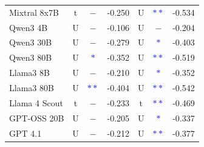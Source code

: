\begin{table}[h]
{\begin{tabular}{@{}l|ccc|ccc@{}}
        \cellcolor{blue!50!black!10}Mixtral 8x7B & \cellcolor{blue!50!black!10}t & \cellcolor{blue!50!black!10}$-$ & \cellcolor{blue!50!black!10}-0.250 & \cellcolor{blue!50!black!10}U & \cellcolor{blue!50!black!10}\textcolor{blue}{$\ast\ast$} & \cellcolor{blue!50!black!10}-0.534 \\
        \cellcolor{brown!10}Qwen3 4B & \cellcolor{brown!10}U & \cellcolor{brown!10}$-$ & \cellcolor{brown!10}-0.106 & \cellcolor{brown!10}U & \cellcolor{brown!10}$-$ & \cellcolor{brown!10}-0.204 \\
        \cellcolor{brown!50!black!10}Qwen3 30B & \cellcolor{brown!50!black!10}U & \cellcolor{brown!50!black!10}$-$ & \cellcolor{brown!50!black!10}-0.279 & \cellcolor{brown!50!black!10}U & \cellcolor{brown!50!black!10}\textcolor{blue}{$\ast$} & \cellcolor{brown!50!black!10}-0.403 \\
        \cellcolor{brown!70!black!10}Qwen3 80B & \cellcolor{brown!70!black!10}U & \cellcolor{brown!70!black!10}\textcolor{blue}{$\ast$} & \cellcolor{brown!70!black!10}-0.352 & \cellcolor{brown!70!black!10}U & \cellcolor{brown!70!black!10}\textcolor{blue}{$\ast\ast$} & \cellcolor{brown!70!black!10}-0.519 \\
        \cellcolor{green!10}Llama3 8B & \cellcolor{green!10}U & \cellcolor{green!10}$-$ & \cellcolor{green!10}-0.210 & \cellcolor{green!10}U & \cellcolor{green!10}\textcolor{blue}{$\ast$} & \cellcolor{green!10}-0.352 \\
        \cellcolor{green!50!black!10}Llama3 80B & \cellcolor{green!50!black!10}U & \cellcolor{green!50!black!10}\textcolor{blue}{$\ast\ast$} & \cellcolor{green!50!black!10}-0.404 & \cellcolor{green!50!black!10}U & \cellcolor{green!50!black!10}\textcolor{blue}{$\ast\ast$} & \cellcolor{green!50!black!10}-0.542 \\
        \cellcolor{green!70!black!10}Llama 4 Scout & \cellcolor{green!70!black!10}t & \cellcolor{green!70!black!10}$-$ & \cellcolor{green!70!black!10}-0.233 & \cellcolor{green!70!black!10}t & \cellcolor{green!70!black!10}\textcolor{blue}{$\ast\ast$} & \cellcolor{green!70!black!10}-0.469 \\
        \cellcolor{cyan!10}GPT-OSS 20B & \cellcolor{cyan!10}U & \cellcolor{cyan!10}$-$ & \cellcolor{cyan!10}-0.205 & \cellcolor{cyan!10}U & \cellcolor{cyan!10}\textcolor{blue}{$\ast$} & \cellcolor{cyan!10}-0.337 \\
        \cellcolor{teal!10}GPT 4.1 & \cellcolor{teal!10}U & \cellcolor{teal!10}$-$ & \cellcolor{teal!10}-0.212 & \cellcolor{teal!10}U & \cellcolor{teal!10}\textcolor{blue}{$\ast\ast$} & \cellcolor{teal!10}-0.377 \\

\end{tabular}}
\end{table}
